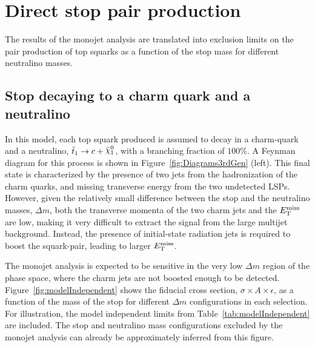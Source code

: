\clearpage
\section{Direct stop pair production}
    \label{sec:DirectStopProduction}

The results of the monojet analysis are translated into exclusion limits on the pair production of top squarks as a function of the stop mass for different neutralino masses.


\subsection{Stop decaying to a charm quark and a neutralino}

In this model, each top squark produced is assumed to decay in a charm-quark and a neutralino, $\stoptocharm$, with a branching fraction of $100\%$.
A Feynman diagram for this process is shown in Figure~\ref{fig:Diagrams3rdGen} (left).
This final state is characterized by the presence of two jets from the hadronization of the charm quarks, and missing transverse energy from the two undetected LSPs.
However, given the relatively small difference between the stop and the neutralino masses, $\Delta m$, both the transverse momenta of the two charm jets and the $E_{\mathrm{T}}^{\mathrm{miss}}$ are low, making it very difficult to extract the signal from the large multijet background.
Instead, the presence of initial-state radiation jets is required to boost the squark-pair, leading to larger $E_{\mathrm{T}}^{\mathrm{miss}}$.

The monojet analysis is expected to be sensitive in the very low $\Delta m$ region of the phase space, where the charm jets are not boosted enough to be detected.
Figure~\ref{fig:modelIndependent} shows the fiducial cross section, $\sigma\times A \times \epsilon$, as a function of the mass of the stop for different $\Delta m$ configurations in each selection.
For illustration, the model independent limits from Table~\ref{tab:modelIndependent} are included.
The stop and neutralino mass configurations excluded by the monojet analysis can already be approximately inferred from this figure.

